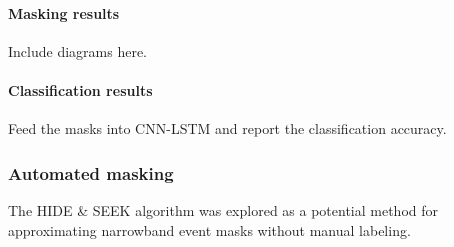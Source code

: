 \paragraph{Masking results}

Include diagrams here.

\paragraph{Classification results}

Feed the masks into CNN-LSTM and report the classification accuracy.

\subsubsection{Automated masking}

The HIDE \& SEEK algorithm was explored as a potential method for approximating narrowband event masks without manual labeling. 


